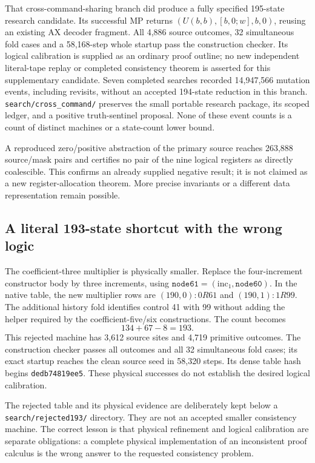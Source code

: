\documentclass[10pt,letterpaper]{article}
\newcommand{\file}[1]{\nolinkurl{#1}}
\begin{document}
That cross-command-sharing branch did produce a fully specified 195-state
research candidate. Its successful MP returns
\((U(b,b),[b,0;w],b,0)\), reusing an existing AX decoder fragment. All
4,886 source outcomes, 32 simultaneous fold cases and a 58,168-step whole
startup pass the construction checker. Its logical calibration is supplied
as an ordinary proof outline; no new independent literal-tape replay or
completed consistency theorem is asserted for this supplementary candidate.
Seven completed searches recorded 14,947,566 mutation events, including
revisits, without an accepted 194-state reduction in this branch.
\file{search/cross_command/} preserves the small portable research package,
its scoped ledger, and a positive truth-sentinel proposal. None of these
event counts is a count of distinct machines or a state-count lower bound.

A reproduced zero/positive abstraction of the primary source reaches
263,888 source/mask pairs and certifies no pair of the nine logical
registers as directly coalescible. This confirms an already supplied
negative result; it is not claimed as a new register-allocation theorem.
More precise invariants or a different data representation remain possible.

\subsection{A literal 193-state shortcut with the wrong logic}

The coefficient-three multiplier is physically smaller. Replace the
four-increment constructor body by three increments, using
\(\texttt{node61}=(\mathrm{inc}_1,\texttt{node60})\). In the native table,
the new multiplier rows are \((190,0):0R61\) and \((190,1):1R99\).
The additional history fold identifies control 41 with 99 without adding
the helper required by the coefficient-five/six constructions. The count
becomes
\[
                         134+67-8=193.
\]
This rejected machine has 3,612 source sites and 4,719 primitive outcomes.
The construction checker passes all outcomes and all 32 simultaneous fold
cases; its exact startup reaches the clean source seed in 58,320 steps.
Its dense table hash begins \texttt{dedb74819ee5}. These physical successes
do not establish the desired logical calibration.



The rejected table and its physical evidence
are deliberately kept below a \file{search/rejected193/} directory. They
are not an accepted smaller consistency machine. The correct lesson is
that physical refinement and logical calibration are separate obligations:
a complete physical implementation of an inconsistent proof calculus is
the wrong answer to the requested consistency problem.
\end{document}
